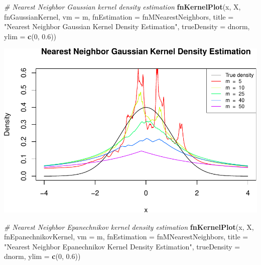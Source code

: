 \documentclass[10pt,]{article}
\newenvironment{Shaded}{\begin{snugshade}}{\end{snugshade}}
\newcommand{\KeywordTok}[1]{\textcolor[rgb]{0.13,0.29,0.53}{\textbf{{#1}}}}
\newcommand{\DataTypeTok}[1]{\textcolor[rgb]{0.13,0.29,0.53}{{#1}}}
\newcommand{\DecValTok}[1]{\textcolor[rgb]{0.00,0.00,0.81}{{#1}}}
\newcommand{\FloatTok}[1]{\textcolor[rgb]{0.00,0.00,0.81}{{#1}}}
\newcommand{\StringTok}[1]{\textcolor[rgb]{0.31,0.60,0.02}{{#1}}}
\newcommand{\CommentTok}[1]{\textcolor[rgb]{0.56,0.35,0.01}{\textit{{#1}}}}
\newcommand{\NormalTok}[1]{{#1}}
\begin{document}
\begin{Shaded}
\begin{Highlighting}[]
\CommentTok{# Nearest Neighbor Gaussian kernel density estimation}
\KeywordTok{fnKernelPlot}\NormalTok{(x, X, fnGaussianKernel, }\DataTypeTok{vm =} \NormalTok{m, }
             \DataTypeTok{fnEstimation =} \NormalTok{fnMNearestNeighbors,}
             \DataTypeTok{title =} \StringTok{"Nearest Neighbor Gaussian Kernel Density Estimation"}\NormalTok{,}
             \DataTypeTok{trueDensity =} \NormalTok{dnorm, }\DataTypeTok{ylim =} \KeywordTok{c}\NormalTok{(}\DecValTok{0}\NormalTok{, }\FloatTok{0.6}\NormalTok{))}
\end{Highlighting}
\end{Shaded}

\includegraphics{project2_files/figure-latex/m-nearest neighbors test-2.pdf}

\begin{Shaded}
\begin{Highlighting}[]
\CommentTok{# Nearest Neighbor Epanechnikov kernel density estimation}
\KeywordTok{fnKernelPlot}\NormalTok{(x, X, fnEpanechnikovKernel, }\DataTypeTok{vm =} \NormalTok{m, }
             \DataTypeTok{fnEstimation =} \NormalTok{fnMNearestNeighbors, }
             \DataTypeTok{title =} \StringTok{"Nearest Neighbor Epanechnikov Kernel Density Estimation"}\NormalTok{,}
             \DataTypeTok{trueDensity =} \NormalTok{dnorm, }\DataTypeTok{ylim =} \KeywordTok{c}\NormalTok{(}\DecValTok{0}\NormalTok{, }\FloatTok{0.6}\NormalTok{))}
\end{Highlighting}
\end{Shaded}
\end{document}
